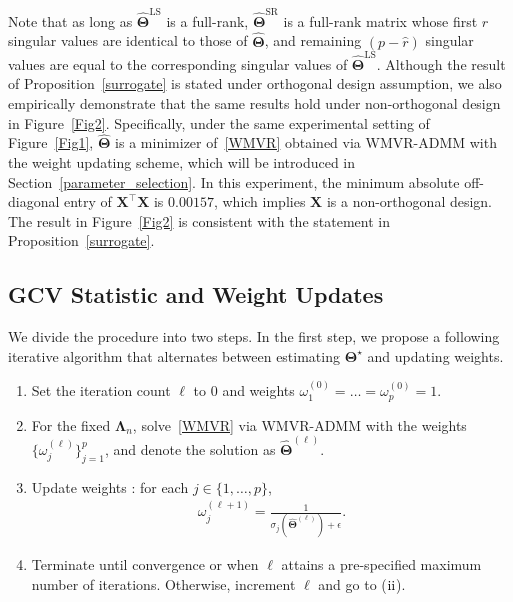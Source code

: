 \documentclass[12pt]{article}
\newcommand{\RN}[1]{%
  \textup{\uppercase\expandafter{\romannumeral#1}}%
}
\begin{document}
Note that as long as $\widehat{\boldsymbol{\Theta}}^{\text{LS}}$ is a full-rank, $\widehat{\boldsymbol{\Theta}}^{\text{SR}}$ is a full-rank matrix whose first $\widehat{r}$ singular values are identical to those of $\widehat{\boldsymbol{\Theta}}$, and remaining $(p-\widehat{r})$ singular values are equal to the  corresponding singular values of $\widehat{\boldsymbol{\Theta}}^{\text{LS}}$.
Although the result of Proposition~\ref{surrogate} is stated under orthogonal design assumption, we also empirically demonstrate that the same results hold under non-orthogonal design in Figure~\ref{Fig2}.
Specifically, under the same experimental setting of Figure~\ref{Fig1}, $\boldsymbol{\widehat{\boldsymbol{\Theta}}}$ is a minimizer of~\eqref{WMVR} obtained via WMVR-ADMM with the weight updating scheme, which will be introduced in Section~\ref{parameter_selection}.
In this experiment, the minimum absolute off-diagonal entry of $\boldsymbol{X}^{\top}\boldsymbol{X}$ is $0.00157$, which implies $\boldsymbol{X}$ is a non-orthogonal design.
The result in Figure~\ref{Fig2} is consistent with the statement in Proposition~\ref{surrogate}.

\subsection{GCV Statistic and Weight Updates}
We divide the procedure into two steps.
In the first step, we propose a following iterative algorithm that alternates between estimating $\boldsymbol{\Theta}^{\star}$ and updating weights.
\begin{enumerate}[topsep=0pt,itemsep=-1ex,partopsep=1ex,parsep=1ex,label=(\Roman*).,align=left]
    \item Set the iteration count $\ell$ to $0$ and weights $\omega_{1}^{(0)}=\dots=\omega_{p}^{(0)}=1$. 
    \item For the fixed $\boldsymbol{\Lambda}_{n}$, solve~\eqref{WMVR} via WMVR-ADMM with the weights $\{\omega_{j}^{(\ell)}\}_{j=1}^{p}$, and denote the solution as  $\widehat{\boldsymbol{\Theta}}^{(\ell)}$. 
    \item Update weights : for each $j\in\{1,\dots,p\}$,
    \begin{align}
        \omega_{j}^{(\ell+1)}=\frac{1}{\sigma_{j}(\widehat{\boldsymbol{\Theta}}^{(\ell)})+\epsilon}.
    \end{align}
    \item Terminate until convergence or when $\ell$ attains a pre-specified maximum number of iterations. 
    Otherwise, increment $\ell$ and go to ($\RN{2}$).
\end{enumerate}
\end{document}
